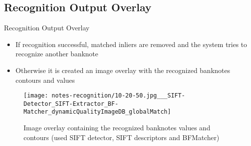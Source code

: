 \subsection{Recognition Output Overlay}
\begin{frame}{Recognition Output Overlay}
	\begin{itemize}
		\item If recognition successful, matched inliers are removed and the system tries to recognize another banknote
		\item Otherwise it is created an image overlay with the recognized banknotes contours and values
	\end{itemize}
	\begin{figure}[H]
		\centering
		\texttt{[image: notes-recognition/10-20-50.jpg\_\_\_SIFT-Detector\_SIFT-Extractor\_BF-Matcher\_dynamicQualityImageDB\_globalMatch]}
		\caption{Image overlay containing the recognized banknotes values and contours (used SIFT detector, SIFT descriptors and BFMatcher)}
		\label{fig:recognition-overlapping-banknotes-0}
	\end{figure}
\end{frame}
